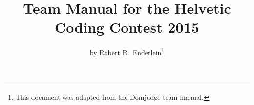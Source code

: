 
% 
%
%
\documentclass[11pt,a4paper]{article}
\usepackage{mathptmx}
\usepackage[in]{fullpage}
\usepackage[absolute]{textpos}
\usepackage{graphicx}
\usepackage[english]{babel}
\usepackage[utf8]{inputenc}
\usepackage{fancyhdr}
\usepackage{color}
\usepackage{url}
\usepackage{longtable}
\usepackage{moreverb}
\pagestyle{fancy}


\renewcommand{\baselinestretch}{0.97}


\newcommand{\titleinfolong}{Team Manual for the Helvetic Coding Contest 2015}
\newcommand{\titleinfo}{Team Manual}
\newcommand{\authorinfo}{Robert R.~Enderlein}
\newcommand{\langinfo}{English}
\newcommand{\taskinfo}{Team Manual}



\title{\titleinfolong}
\author{by \authorinfo\footnote{This document was adapted from the Domjudge team manual.}}
\date{}

\renewcommand{\headrulewidth}{0pt}
\renewcommand{\footrulewidth}{0.4pt}
\lhead{}
\chead{}
\rhead{}
\lfoot{\textcolor{gray}{Helvetic Coding Contest 2015}}
\cfoot{\thepage}
\rfoot{\textcolor{gray}{\titleinfo}}


\maketitle
\thispagestyle{fancy}
\setcounter{page}{1} 

